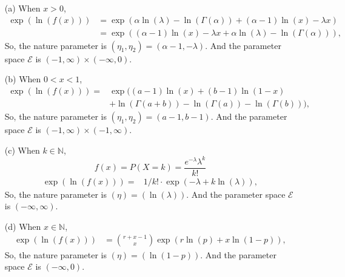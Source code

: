 \documentclass[12pt]{article}
\begin{document}
    \begin{solution}
        \begin{itemize}
            \item[(a)] When \(x>0\), 
            \[
                \begin{aligned}
                    \exp(\ln(f(x)))&=\exp(\alpha\ln(\lambda)-\ln(\Gamma(\alpha))+(\alpha-1)\ln(x)-\lambda x)\\
                    &=\exp((\alpha-1)\ln(x)-\lambda x+\alpha\ln(\lambda)-\ln(\Gamma(\alpha))), 
                \end{aligned}
            \]
            So, the nature parameter is $(\eta_1,\eta_2)=(\alpha-1, -\lambda)$. And the parameter space \(\mathcal{E}\) is \((-1,\infty)\times(-\infty,0)\). 
            \item[(b)] When \(0<x<1\), 
            \[
                \begin{aligned}
                    \exp(\ln(f(x)))=&\exp((a-1)\ln(x)+(b-1)\ln(1-x)\\&+\ln(\Gamma(a+b))-\ln(\Gamma(a))-\ln(\Gamma(b))), 
                \end{aligned}
            \] 
            So, the nature parameter is $(\eta_1,\eta_2)=(a-1, b-1)$. And the parameter space \(\mathcal{E}\) is \((-1,\infty)\times(-1,\infty)\). 
            \item[(c)] When \(k\in\mathbb{N}\), 
            \[
                f(x)=P(X=k)=\frac{e^{-\lambda}\lambda^k}{k!}
            \]
            \[
                \begin{aligned}
                    \exp(\ln(f(x)))=&1/k!\cdot\exp(-\lambda+k\ln(\lambda)), 
                \end{aligned}
            \]
            So, the nature parameter is $(\eta)=(\ln(\lambda))$. And the parameter space \(\mathcal{E}\) is \((-\infty,\infty)\). 
            \item[(d)] When \(x\in\mathbb{N}\), 
            \[
                \begin{aligned}
                    \exp(\ln(f(x)))&=\binom{r+x-1}{x}\exp\left(r\ln(p)+x\ln(1-p)\right), 
                \end{aligned}
            \]
            So, the nature parameter is $(\eta)=(\ln(1-p))$. And the parameter space \(\mathcal{E}\) is \((-\infty,0)\). 
        \end{itemize}
    \end{solution}
\end{document}
